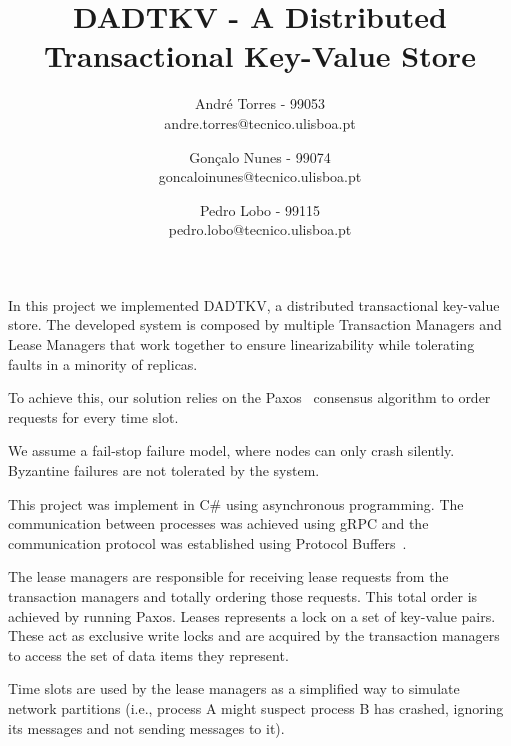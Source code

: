 \documentclass[times, 10pt,twocolumn]{article}
\begin{document}
\title{DADTKV - A Distributed Transactional Key-Value Store}

\author{André Torres - 99053 \\ andre.torres@tecnico.ulisboa.pt\\
\and
Gonçalo Nunes - 99074 \\ goncaloinunes@tecnico.ulisboa.pt\\
\and
Pedro Lobo - 99115 \\ pedro.lobo@tecnico.ulisboa.pt
}

\maketitle
\thispagestyle{empty}


In this project we implemented DADTKV, a distributed transactional key-value store. The developed system is composed by multiple Transaction Managers and Lease Managers that work together to ensure linearizability while tolerating faults in a minority of replicas.

To achieve this, our solution relies on the Paxos~\cite{paxos} consensus algorithm to order requests for every time slot.

We assume a fail-stop failure model, where nodes can only crash silently. Byzantine failures are not tolerated by the system.

This project was implement in C\# using asynchronous programming. The communication between processes was achieved using gRPC and the communication protocol was established using Protocol Buffers~\cite{protobuf}.


The lease managers are responsible for receiving lease requests from the transaction managers and totally ordering those requests. This total order is achieved by running Paxos. Leases represents a lock on a set of key-value pairs. These act as exclusive write locks and are acquired by the transaction managers to access the set of data items they represent.


Time slots are used by the lease managers as a simplified way to simulate network partitions (i.e., process A might suspect process B has crashed, ignoring its messages and not sending messages to it).
\end{document}
